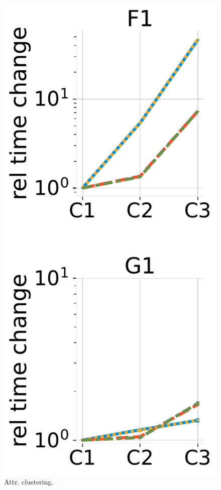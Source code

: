 \begin{figure}
\begin{minipage}[c]{0.23\textwidth}
		\centering
		\includegraphics[scale=0.24]{img/cluster.pdf}
		\vspace{-1em}
		\caption{Attr. clustering.}
		\label{fig:cluster}
	\end{minipage}
	\vspace{-1em}
\end{figure}